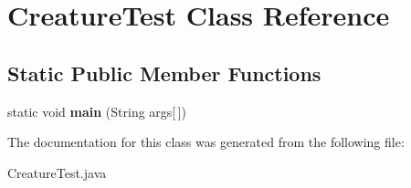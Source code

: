 \hypertarget{class_creature_test}{}\section{Creature\+Test Class Reference}
\label{class_creature_test}
\subsection*{Static Public Member Functions}
\begin{DoxyCompactItemize}
\item 
\hypertarget{class_creature_test_a668cae78bfb33180f3401e98d727365b}{}static void {\bfseries main} (String args\mbox{[}$\,$\mbox{]})\label{class_creature_test_a668cae78bfb33180f3401e98d727365b}

\end{DoxyCompactItemize}


The documentation for this class was generated from the following file\+:\begin{DoxyCompactItemize}
\item 
Creature\+Test.\+java\end{DoxyCompactItemize}
